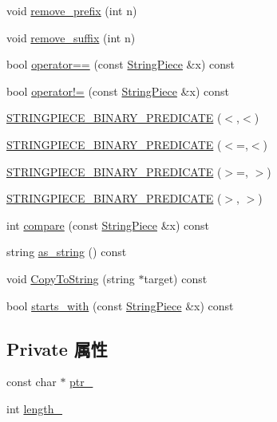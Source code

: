 \begin{DoxyCompactItemize}
void \hyperlink{classmuduo_1_1StringPiece_a59ea335a45cf183fb65e28ed434cad10}{remove\+\_\+prefix} (int n)
\item 
void \hyperlink{classmuduo_1_1StringPiece_a63be252f1ef4e181e3f878ed0c178311}{remove\+\_\+suffix} (int n)
\item 
bool \hyperlink{classmuduo_1_1StringPiece_a920993bb85cf3c1fc3aedf6a1e8bf691}{operator==} (const \hyperlink{classmuduo_1_1StringPiece}{String\+Piece} \&x) const
\item 
bool \hyperlink{classmuduo_1_1StringPiece_a47eee77c6839712b69d886de179036c0}{operator!=} (const \hyperlink{classmuduo_1_1StringPiece}{String\+Piece} \&x) const
\item 
\hyperlink{classmuduo_1_1StringPiece_a3a9b0c7ca5a3f9c77e09cf2e9304b30e}{S\+T\+R\+I\+N\+G\+P\+I\+E\+C\+E\+\_\+\+B\+I\+N\+A\+R\+Y\+\_\+\+P\+R\+E\+D\+I\+C\+A\+TE} ($<$,$<$)
\item 
\hyperlink{classmuduo_1_1StringPiece_a5a100b406673db090479c909f3f68ca8}{S\+T\+R\+I\+N\+G\+P\+I\+E\+C\+E\+\_\+\+B\+I\+N\+A\+R\+Y\+\_\+\+P\+R\+E\+D\+I\+C\+A\+TE} ($<$=,$<$)
\item 
\hyperlink{classmuduo_1_1StringPiece_ab5fd7ad677a84e93b3c6001ce4521871}{S\+T\+R\+I\+N\+G\+P\+I\+E\+C\+E\+\_\+\+B\+I\+N\+A\+R\+Y\+\_\+\+P\+R\+E\+D\+I\+C\+A\+TE} ($>$=, $>$)
\item 
\hyperlink{classmuduo_1_1StringPiece_a4a553a89f26aef85bcfaa6658b5640fe}{S\+T\+R\+I\+N\+G\+P\+I\+E\+C\+E\+\_\+\+B\+I\+N\+A\+R\+Y\+\_\+\+P\+R\+E\+D\+I\+C\+A\+TE} ($>$, $>$)
\item 
int \hyperlink{classmuduo_1_1StringPiece_adc02cf8460f87c412a490f0f7fce3b8e}{compare} (const \hyperlink{classmuduo_1_1StringPiece}{String\+Piece} \&x) const
\item 
string \hyperlink{classmuduo_1_1StringPiece_a53670f3465c15e32425fd9180b53e962}{as\+\_\+string} () const
\item 
void \hyperlink{classmuduo_1_1StringPiece_ae87831fc542134c6bb04004740658a15}{Copy\+To\+String} (string $\ast$target) const
\item 
bool \hyperlink{classmuduo_1_1StringPiece_a02b5196f9bd404fb9d8f60121c770114}{starts\+\_\+with} (const \hyperlink{classmuduo_1_1StringPiece}{String\+Piece} \&x) const
\end{DoxyCompactItemize}
\subsection*{Private 属性}
\begin{DoxyCompactItemize}
\item 
const char $\ast$ \hyperlink{classmuduo_1_1StringPiece_a3562ccc1fbaeaf1cb0f2892aa2f299b9}{ptr\+\_\+}
\item 
int \hyperlink{classmuduo_1_1StringPiece_a4bac9b810d0cf891c8fcbc974e989739}{length\+\_\+}
\end{DoxyCompactItemize}



